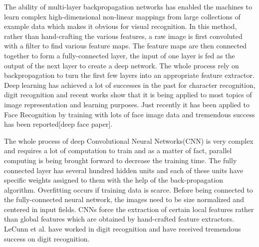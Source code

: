 The ability of multi-layer backpropagation networks has enabled the machines to learn complex high-dimensional non-linear mappings from large collections of example data which makes it obvious for visual recognition. In this method, rather than hand-crafting the various features, a raw image is first convoluted with a filter to find various feature maps. The feature maps are then connected together to form a fully-connected layer, the input of one layer is fed as the output of the next layer to create a deep network. The whole process rely on backpropagation to turn the first few layers into an appropriate feature extractor. Deep learning has achieved a lot of successes in the past for character recognition, digit recognition and recent works show that it is being applied to most topics of image representation and learning purposes. Just recently it has been applied to Face Recognition by training with lots of face image data and tremendous success has been reported[deep face paper].

The whole process of deep Convolutional Neural Networks(CNN)\cite{cnn} is very complex and requires a lot of computation to train and as a matter of fact, parallel computing is being brought forward to decrease the training time. The fully connected layer has several hundred hidden units and each of these units have specific weights assigned to them with the help of the back-propagation algorithm. Overfitting occurs if training data is scarce. Before being connected to the fully-connected neural network, the images need to be size normalized and centered in input fields. CNNs force the extraction of certain local features rather than global features which are obtained by hand-crafted feature extractors. LeCunn et al.\cite{lecunn} have worked in digit recognition and have received tremendous success on digit recognition.

